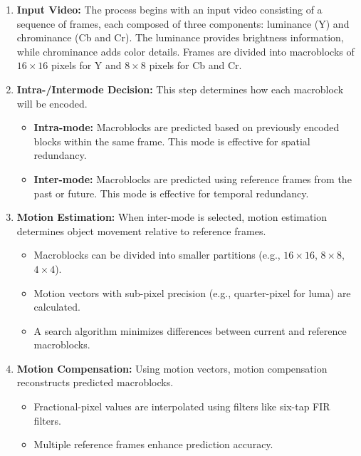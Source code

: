     \begin{enumerate}[label=\textbf{\roman*.}]
        \item \textbf{Input Video:}  
        The process begins with an input video consisting of a sequence of frames, each composed of three components: luminance (Y) and chrominance (Cb and Cr). The luminance provides brightness information, while chrominance adds color details. Frames are divided into macroblocks of $16 \times 16$ pixels for Y and $8 \times 8$ pixels for Cb and Cr.
    
        \item \textbf{Intra-/Intermode Decision:}  
        This step determines how each macroblock will be encoded.
        \begin{itemize}
            \item \textbf{Intra-mode:} Macroblocks are predicted based on previously encoded blocks within the same frame. This mode is effective for spatial redundancy.
            \item \textbf{Inter-mode:} Macroblocks are predicted using reference frames from the past or future. This mode is effective for temporal redundancy.
        \end{itemize}
    
        \item \textbf{Motion Estimation:}  
        When inter-mode is selected, motion estimation determines object movement relative to reference frames.
        \begin{itemize}
            \item Macroblocks can be divided into smaller partitions (e.g., $16 \times 16$, $8 \times 8$, $4 \times 4$).
            \item Motion vectors with sub-pixel precision (e.g., quarter-pixel for luma) are calculated.
            \item A search algorithm minimizes differences between current and reference macroblocks.
        \end{itemize}
    
        \item \textbf{Motion Compensation:}  
        Using motion vectors, motion compensation reconstructs predicted macroblocks.
        \begin{itemize}
            \item Fractional-pixel values are interpolated using filters like six-tap FIR filters.
            \item Multiple reference frames enhance prediction accuracy.
        \end{itemize}
    

\end{enumerate}
